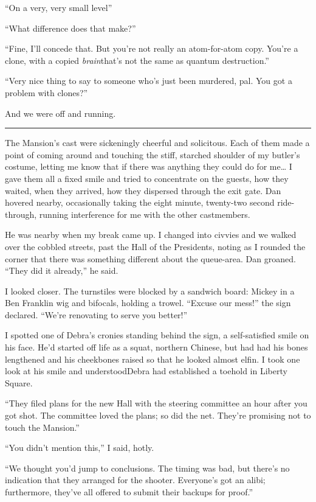 “On a very, very small level{\dash}”

“What difference does that make?”

“Fine, I'll concede that. But you're not really an atom-for-atom
copy. You're a clone, with a copied \emph{brain}{\dash}that's not the
same as quantum destruction.”

“Very nice thing to say to someone who's just been murdered, pal.
You got a problem with clones?”

And we were off and running.

\begin{center}\rule{1in}{0.4pt}\end{center}

The Mansion's cast were sickeningly cheerful and solicitous. Each
of them made a point of coming around and touching the stiff,
starched shoulder of my butler's costume, letting me know that if
there was anything they could do for me… I gave them all a fixed
smile and tried to concentrate on the guests, how they waited, when
they arrived, how they dispersed through the exit gate. Dan hovered
nearby, occasionally taking the eight minute, twenty-two second
ride-through, running interference for me with the other
castmembers.

He was nearby when my break came up. I changed into civvies and we
walked over the cobbled streets, past the Hall of the Presidents,
noting as I rounded the corner that there was something different
about the queue-area. Dan groaned. “They did it already,” he said.

I looked closer. The turnstiles were blocked by a sandwich board:
Mickey in a Ben Franklin wig and bifocals, holding a trowel.
“Excuse our mess!” the sign declared. “We're renovating to serve
you better!”

I spotted one of Debra's cronies standing behind the sign, a
self-satisfied smile on his face. He'd started off life as a squat,
northern Chinese, but had had his bones lengthened and his
cheekbones raised so that he looked almost elfin. I took one look
at his smile and understood{\dash}Debra had established a toehold in
Liberty Square.

“They filed plans for the new Hall with the steering committee an
hour after you got shot. The committee loved the plans; so did the
net. They're promising not to touch the Mansion.”

“You didn't mention this,” I said, hotly.

“We thought you'd jump to conclusions. The timing was bad, but
there's no indication that they arranged for the shooter.
Everyone's got an alibi; furthermore, they've all offered to submit
their backups for proof.”

